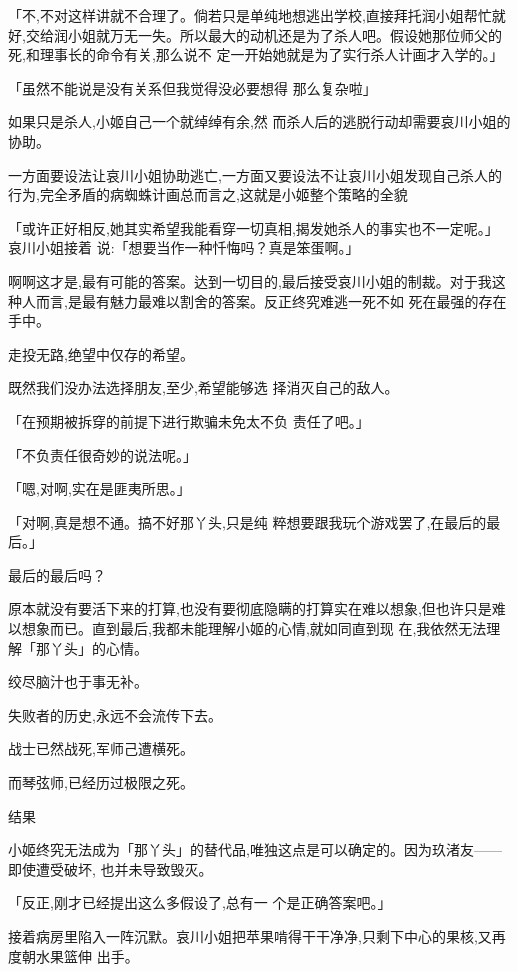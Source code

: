 \documentclass{article}
\begin{document}
「不,不对这样讲就不合理了。倘若只是单纯地想逃出学校,直接拜托润小姐帮忙就好,交给润小姐就万无一失。所以最大的动机还是为了杀人吧。假设她那位师父的死,和理事长的命令有关,那么说不
定一开始她就是为了实行杀人计画才入学的。」 

「虽然不能说是没有关系但我觉得没必要想得
那么复杂啦」 

\newpage

如果只是杀人,小姬自己一个就绰绰有余,然
而杀人后的逃脱行动却需要哀川小姐的协助。 

一方面要设法让哀川小姐协助逃亡,一方面又要设法不让哀川小姐发现自己杀人的行为,完全矛盾的病蜘蛛计画总而言之,这就是小姬整个策略的全貌

「或许正好相反,她其实希望我能看穿一切真相,揭发她杀人的事实也不一定呢。」哀川小姐接着
说:「想要当作一种忏悔吗？真是笨蛋啊。」 

啊啊这才是,最有可能的答案。达到一切目的,最后接受哀川小姐的制裁。对于我这种人而言,是最有魅力最难以割舍的答案。反正终究难逃一死不如
死在最强的存在手中。 


走投无路,绝望中仅存的希望。 

既然我们没办法选择朋友,至少,希望能够选
择消灭自己的敌人。 

\newpage

「在预期被拆穿的前提下进行欺骗未免太不负
责任了吧。」 


「不负责任很奇妙的说法呢。」 


「嗯,对啊,实在是匪夷所思。」 

「对啊,真是想不通。搞不好那丫头,只是纯
粹想要跟我玩个游戏罢了,在最后的最后。」 


最后的最后吗？ 

原本就没有要活下来的打算,也没有要彻底隐瞒的打算实在难以想象,但也许只是难以想象而已。直到最后,我都未能理解小姬的心情,就如同直到现
在,我依然无法理解「那丫头」的心情。 


绞尽脑汁也于事无补。 


失败者的历史,永远不会流传下去。 

\newpage


战士已然战死,军师己遭横死。 


而琴弦师,已经历过极限之死。 


结果 

小姬终究无法成为「那丫头」的替代品,唯独这点是可以确定的。因为玖渚友——即使遭受破坏,
也并未导致毁灭。 

「反正,刚才已经提出这么多假设了,总有一
个是正确答案吧。」 

接着病房里陷入一阵沉默。哀川小姐把苹果啃得干干净净,只剩下中心的果核,又再度朝水果篮伸
出手。 
\end{document}
